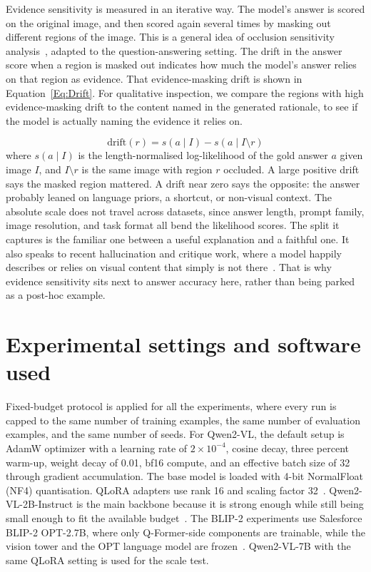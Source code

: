 \documentclass[12pt,bibliography=totoc,listof=totoc,BCOR=5mm,DIV=12,oneside,open=any]{scrbook}
\let\cite\citep
\begin{document}
Evidence sensitivity is measured in an iterative way.
The model's answer is scored on the original image, and then scored again several times by masking out different regions of the image.
This is a general idea of occlusion sensitivity analysis~\cite{zeiler2014visualizing}, adapted to the question-answering setting.
The drift in the answer score when a region is masked out indicates how much the model's answer relies on that region as evidence.
That evidence-masking drift is shown in Equation~\ref{Eq:Drift}.
For qualitative inspection, we compare the regions with high evidence-masking drift to the content named in the generated rationale,
to see if the model is actually naming the evidence it relies on.

\begin{equation}
    \mathrm{drift}(r) = s\!\left(a \mid I\right) - s\!\left(a \mid I \setminus r\right)
    \label{Eq:Drift}
\end{equation}
where $s(a \mid I)$ is the length-normalised log-likelihood of the gold answer $a$ given image $I$, and $I \setminus r$ is the same image with region $r$ occluded.
A large positive drift says the masked region mattered.
A drift near zero says the opposite: the answer probably leaned on language priors, a shortcut, or non-visual context.
The absolute scale does not travel across datasets, since answer length, prompt family, image resolution, and task format all bend the likelihood scores.
The split it captures is the familiar one between a useful explanation and a faithful one.
It also speaks to recent hallucination and critique work, where a model happily describes or relies on visual content that simply is not there~\cite{guan2024hallusionbench,jiang2024hacl,wu2025visco,zhang2025criticv}.
That is why evidence sensitivity sits next to answer accuracy here, rather than being parked as a post-hoc example.

\section{Experimental settings and software used}

Fixed-budget protocol is applied for all the experiments, 
where every run is capped to the same number of training examples,
the same number of evaluation examples, and the same number of seeds.
For Qwen2-VL, the default setup is AdamW optimizer with a learning rate of $2 \times 10^{-4}$,
cosine decay, three percent warm-up, weight decay of 0.01, bf16 compute, and an effective batch size of 32 through gradient accumulation.
The base model is loaded with 4-bit NormalFloat (NF4) quantisation.
QLoRA adapters use rank 16 and scaling factor 32~\cite{hu2022lora,dettmers2023qlora}.
Qwen2-VL-2B-Instruct is the main backbone because it is strong enough while still being small enough to fit the available budget~\cite{wang2024qwen2vl}.
The BLIP-2 experiments use Salesforce BLIP-2 OPT-2.7B, where only Q-Former-side components are trainable, while the vision tower and the OPT language model are frozen~\cite{li2023blip2}.
Qwen2-VL-7B with the same QLoRA setting is used for the scale test.
\end{document}
